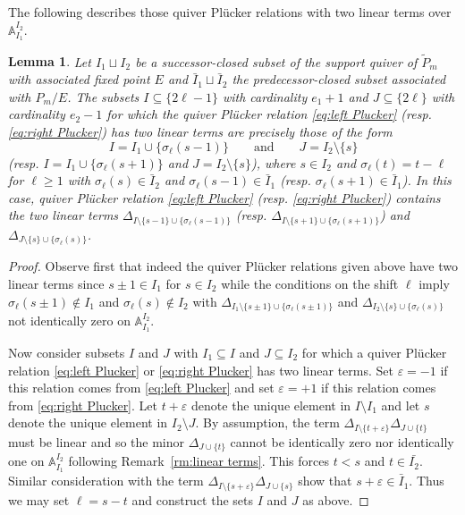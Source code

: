 \documentclass{amsart}
\newtheorem{lemma}[theorem]{Lemma}
\numberwithin{equation}{section}
\renewcommand{\AA}{\mathbb{A}}
\begin{document}
  The following describes those quiver Pl\"ucker relations with two linear terms over $\AA_{I_1}^{I_2}$.
  \begin{lemma}
    Let $I_1\sqcup I_2$ be a successor-closed subset of the support quiver of $\tilde P_m$ with associated fixed point $E$ and $\bar{I}_1\sqcup\bar{I}_2$ the predecessor-closed subset associated with $P_m/E$.
    The subsets $I\subseteq\{2\ell-1\}$ with cardinality $e_1+1$ and $J\subseteq\{2\ell\}$ with cardinality $e_2-1$ for which the quiver Pl\"ucker relation \eqref{eq:left Plucker} (resp. \eqref{eq:right Plucker}) has two linear terms are precisely those of the form
    \[I=I_1\cup\{\sigma_\ell(s-1)\} \qquad \text{and} \qquad J=I_2\setminus\{s\}\]
    (resp. $I=I_1\cup\{\sigma_\ell(s+1)\}$ and $J=I_2\setminus\{s\}$), where $s\in I_2$ and $\sigma_\ell(t)=t-\ell$ for $\ell\ge1$ with $\sigma_\ell(s)\in\bar{I}_2$ and $\sigma_\ell(s-1)\in\bar{I}_1$ (resp. $\sigma_\ell(s+1)\in\bar{I}_1$).
    In this case, quiver Pl\"ucker relation \eqref{eq:left Plucker} (resp. \eqref{eq:right Plucker}) contains the two linear terms $\Delta_{I\setminus\{s-1\}\cup\{\sigma_\ell(s-1)\}}$ (resp. $\Delta_{I\setminus\{s+1\}\cup\{\sigma_\ell(s+1)\}}$) and $\Delta_{J\setminus\{s\}\cup\{\sigma_\ell(s)\}}$.
  \end{lemma}
  \begin{proof}
    Observe first that indeed the quiver Pl\"ucker relations given above have two linear terms since $s\pm1\in I_1$ for $s\in I_2$ while the conditions on the shift $\ell$ imply $\sigma_\ell(s\pm1)\notin I_1$ and $\sigma_\ell(s)\notin I_2$ with $\Delta_{I_1\setminus\{s\pm1\}\cup\{\sigma_\ell(s\pm1)\}}$ and $\Delta_{I_2\setminus\{s\}\cup\{\sigma_\ell(s)\}}$ not identically zero on $\AA_{I_1}^{I_2}$.

    Now consider subsets $I$ and $J$ with $I_1\subseteq I$ and $J\subseteq I_2$ for which a quiver Pl\"ucker relation \eqref{eq:left Plucker} or \eqref{eq:right Plucker} has two linear terms.
    Set $\varepsilon=-1$ if this relation comes from \eqref{eq:left Plucker} and set $\varepsilon=+1$ if this relation comes from \eqref{eq:right Plucker}.
    Let $t+\varepsilon$ denote the unique element in $I\setminus I_1$ and let $s$ denote the unique element in $I_2\setminus J$.
    By assumption, the term $\Delta_{I\setminus\{t+\varepsilon\}} \Delta_{J\cup\{t\}}$ must be linear and so the minor $\Delta_{J\cup\{t\}}$ cannot be identically zero nor identically one on $\AA_{I_1}^{I_2}$ following Remark~\ref{rm:linear terms}.
    This forces $t<s$ and $t\in\bar{I_2}$.
    Similar consideration with the term $\Delta_{I\setminus\{s+\varepsilon\}} \Delta_{J\cup\{s\}}$ show that $s+\varepsilon\in\bar{I}_1$.
    Thus we may set $\ell=s-t$ and construct the sets $I$ and $J$ as above.
  \end{proof}
\end{document}
